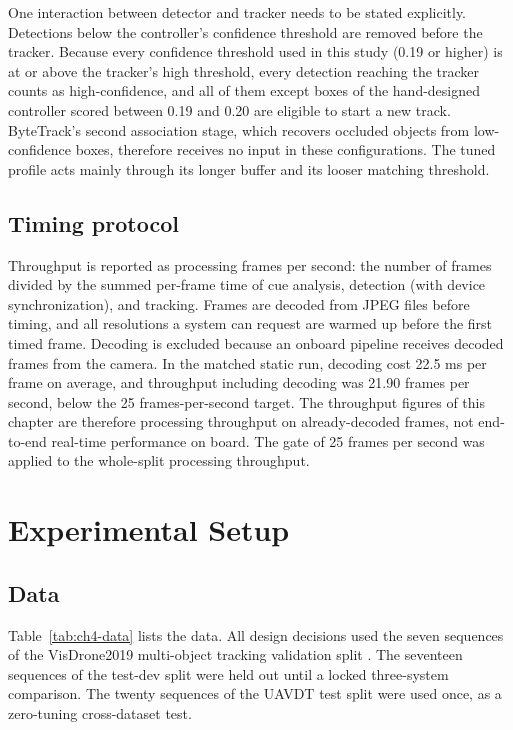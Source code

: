 One interaction between detector and tracker needs to be stated explicitly. Detections below the controller's confidence threshold are removed before the tracker. Because every confidence threshold used in this study (0.19 or higher) is at or above the tracker's high threshold, every detection reaching the tracker counts as high-confidence, and all of them except boxes of the hand-designed controller scored between 0.19 and 0.20 are eligible to start a new track. ByteTrack's second association stage, which recovers occluded objects from low-confidence boxes, therefore receives no input in these configurations. The tuned profile acts mainly through its longer buffer and its looser matching threshold.

\subsection{Timing protocol}
Throughput is reported as processing frames per second: the number of frames divided by the summed per-frame time of cue analysis, detection (with device synchronization), and tracking. Frames are decoded from JPEG files before timing, and all resolutions a system can request are warmed up before the first timed frame. Decoding is excluded because an onboard pipeline receives decoded frames from the camera. In the matched static run, decoding cost 22.5 ms per frame on average, and throughput including decoding was 21.90 frames per second, below the 25 frames-per-second target. The throughput figures of this chapter are therefore processing throughput on already-decoded frames, not end-to-end real-time performance on board. The gate of 25 frames per second was applied to the whole-split processing throughput.

\section{Experimental Setup}\label{sec:ch4-setup}

\subsection{Data}
Table~\ref{tab:ch4-data} lists the data. All design decisions used the seven sequences of the VisDrone2019 multi-object tracking validation split \cite{zhu2022visdrone}. The seventeen sequences of the test-dev split were held out until a locked three-system comparison. The twenty sequences of the UAVDT test split \cite{du2018uavdt} were used once, as a zero-tuning cross-dataset test.

